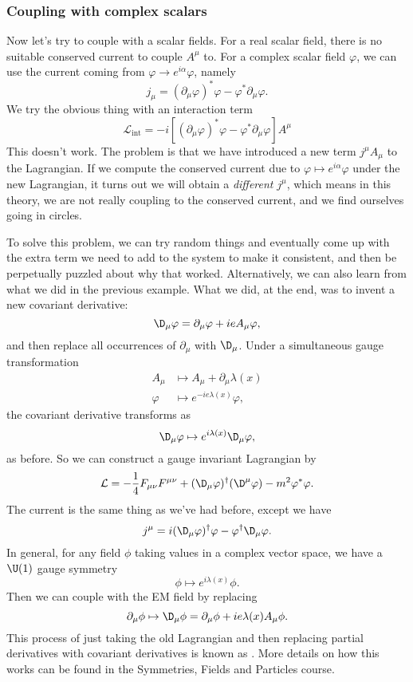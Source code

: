 \documentclass[a4paper]{article}
\begin{document}
\subsubsection*{Coupling with complex scalars}
Now let's try to couple with a scalar fields. For a real scalar field, there is no suitable conserved current to couple $A^\mu$ to. For a complex scalar field $\varphi$, we can use the current coming from $\varphi \to e^{i\alpha} \varphi$, namely
\[
  j_\mu = (\partial_\mu \varphi)^* \varphi - \varphi^* \partial_\mu \varphi.
\]
We try the obvious thing with an interaction term
\[
  \mathcal{L}_{\mathrm{int}} = -i [(\partial_\mu \varphi)^* \varphi - \varphi^* \partial_\mu \varphi] A^\mu
\]
This doesn't work. The problem is that we have introduced a new term $j^\mu A_\mu$ to the Lagrangian. If we compute the conserved current due to $\varphi \mapsto e^{i\alpha} \varphi$ under the new Lagrangian, it turns out we will obtain a \emph{different} $j^\mu$, which means in this theory, we are not really coupling to the conserved current, and we find ourselves going in circles.

To solve this problem, we can try random things and eventually come up with the extra term we need to add to the system to make it consistent, and then be perpetually puzzled about why that worked. Alternatively, we can also learn from what we did in the previous example. What we did, at the end, was to invent a new covariant derivative:
\[
  \D_\mu \varphi = \partial_\mu \varphi + ie A_\mu \varphi,
\]
and then replace all occurrences of $\partial_\mu$ with $\D_\mu$. Under a simultaneous gauge transformation
\begin{align*}
  A_\mu &\mapsto A_\mu + \partial_\mu \lambda(x)\\
  \varphi &\mapsto e^{-ie \lambda(x)} \varphi,
\end{align*}
the covariant derivative transforms as
\[
  \D_\mu \varphi \mapsto e^{i\lambda(x)} \D_\mu \varphi,
\]
as before. So we can construct a gauge invariant Lagrangian by
\[
  \mathcal{L} = -\frac{1}{4} F_{\mu\nu}F^{\mu\nu} + (\D_\mu \varphi)^\dagger (\D^\mu \varphi) - m^2 \varphi^* \varphi.
\]
The current is the same thing as we've had before, except we have
\[
  j^\mu = i(\D_\mu \varphi)^\dagger \varphi - \varphi^\dagger \D_\mu \varphi.
\]
In general, for any field $\phi$ taking values in a complex vector space, we have a $\U(1)$ gauge symmetry
\[
  \phi \mapsto e^{i\lambda(x)} \phi.
\]
Then we can couple with the EM field by replacing
\[
  \partial_\mu \phi \mapsto \D_\mu \phi = \partial_\mu \phi+ ie \lambda(x) A_\mu \phi.
\]
This process of just taking the old Lagrangian and then replacing partial derivatives with covariant derivatives is known as . More details on how this works can be found in the Symmetries, Fields and Particles course.
\end{document}
